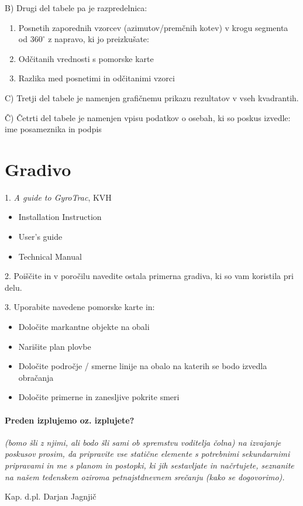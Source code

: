 \flushleft B) Drugi del tabele pa je razpredelnica:

\begin{enumerate}
	\item	Posnetih zaporednih vzorcev (azimutov/premčnih kotev) v krogu segmenta od $360^\circ$ z napravo, ki jo preizkušate:
	\item	Odčitanih vrednosti s pomorske karte
	\item	Razlika med posnetimi in odčitanimi vzorci
\end{enumerate}

\flushleft C) Tretji del tabele je namenjen grafičnemu prikazu rezultatov v vseh kvadrantih.

\flushleft Č) Četrti del tabele je namenjen vpisu podatkov o osebah, ki so poskus izvedle: ime posameznika in podpis


\section{Gradivo}
\label{sec:VrtKompas_Grad}

 1. \textit{A guide to GyroTrac}, KVH
 \begin{itemize}
 \item Installation Instruction
 \item User’s guide
 \item Technical Manual
 \end{itemize}
 
 2. Poiščite in v poročilu navedite ostala primerna gradiva, ki so vam koristila pri delu.
 
 3. Uporabite navedene pomorske karte in:
 \begin{itemize}
 \item	Določite markantne objekte na obali
 \item	Narišite plan plovbe
 \item	Določite področje / smerne linije na obalo na katerih se bodo izvedla obračanja
 \item	Določite primerne in zanesljive pokrite smeri
 \end{itemize}


\paragraph{\textbf{Preden izplujemo oz. izplujete?}}
\textit{ (bomo šli z njimi, ali bodo šli sami ob spremstvu voditelja čolna) na izvajanje poskusov prosim, da pripravite vse statične elemente s potrebnimi  sekundarnimi pripravami in me s planom in postopki, ki jih sestavljate in načrtujete, seznanite na našem tedenskem oziroma petnajstdnevnem srečanju (kako se dogovorimo).}

\begin{flushright}
	Kap. d.pl. Darjan Jagnjič  
\end{flushright}



%
